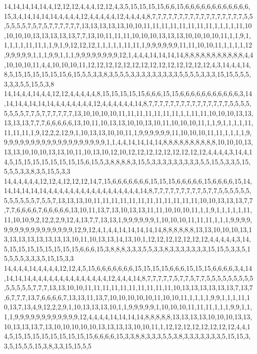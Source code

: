 14,14,14,14,14,4,12,12,12,4,4,4,12,12,4,3,5,15,15,15,15,6,6,15,6,6,6,6,6,6,6,6,6,6,6,6,15,3,4,14,14,14,14,4,4,4,4,12,4,4,4,4,4,12,4,4,4,4,8,7,7,7,7,7,7,7,7,7,7,7,7,7,7,7,7,7,5,5,5,5,5,5,7,5,7,5,7,7,7,7,7,7,13,13,13,13,13,10,10,11,11,11,11,11,11,11,11,1,1,1,1,11,10,10,10,10,13,13,13,13,13,7,7,13,10,11,11,11,10,10,10,13,13,13,10,10,10,10,11,1,1,9,1,1,1,1,1,11,11,1,1,9,1,9,12,12,12,1,1,1,1,1,11,11,1,9,9,9,9,9,9,11,11,10,10,11,1,1,1,1,12,9,9,9,9,9,1,1,1,9,9,1,1,1,9,9,9,9,9,9,9,9,12,1,4,4,4,14,14,14,14,8,8,8,8,8,8,8,8,8,8,8,4,4,10,10,10,11,4,4,10,10,10,11,12,12,12,12,12,12,12,12,12,12,12,12,12,12,4,3,14,4,4,14,8,5,15,15,15,15,15,15,6,15,5,5,3,3,8,3,5,5,5,3,3,3,3,3,3,3,3,3,5,5,5,5,3,3,3,15,15,5,5,5,3,3,3,5,5,15,5,3,8
14,14,4,4,14,4,4,12,12,4,4,4,4,4,8,15,15,15,15,15,6,6,6,15,15,6,6,6,6,6,6,6,6,6,6,6,3,14,14,14,4,14,14,14,4,4,4,4,4,4,4,12,4,4,4,4,4,4,14,8,7,7,7,7,7,7,7,7,7,7,7,7,7,7,7,5,5,5,5,5,5,5,5,7,7,5,7,7,7,7,7,7,13,10,10,10,10,11,11,11,11,11,11,11,1,1,11,11,10,10,10,13,13,13,13,13,7,7,7,6,6,6,6,6,13,10,11,10,13,13,10,10,13,10,11,10,10,10,11,1,1,9,1,1,1,1,11,11,11,11,1,9,12,2,2,12,9,1,10,13,13,10,10,11,1,9,9,9,9,9,9,11,10,10,10,11,11,1,1,1,1,9,9,9,9,9,9,9,9,9,9,9,9,9,9,9,9,9,9,9,9,1,1,4,4,14,14,14,14,8,8,8,8,8,8,8,8,8,8,10,10,10,13,13,13,10,10,10,13,13,10,11,10,13,10,12,10,12,12,12,12,12,12,12,12,12,4,4,4,4,3,14,4,14,5,15,15,15,15,15,15,15,15,6,15,5,3,8,8,8,8,3,15,5,3,3,3,3,3,3,3,3,3,5,5,15,5,3,3,5,15,5,5,5,3,3,8,3,5,15,5,3,3
14,4,4,4,4,4,12,12,4,12,12,12,14,7,15,6,6,6,6,6,6,6,15,15,15,6,6,6,6,6,15,6,6,6,6,15,14,14,14,14,14,14,4,4,4,4,4,4,4,4,4,4,4,4,4,4,4,4,4,14,8,7,7,7,7,7,7,7,7,7,5,7,7,5,5,5,5,5,5,5,5,5,5,5,5,7,5,5,7,13,13,13,10,11,11,11,11,11,11,11,11,11,11,11,11,10,10,13,13,13,7,7,7,7,6,6,6,6,7,6,6,6,6,6,13,10,11,13,7,13,10,13,13,11,11,10,10,10,11,1,1,9,1,1,1,1,1,11,11,10,10,9,2,12,2,2,9,12,4,13,7,7,13,13,1,9,9,9,9,9,9,1,10,10,10,11,11,11,1,1,1,9,9,9,9,9,9,9,9,9,9,9,9,9,9,9,9,9,12,9,12,4,1,4,4,14,14,14,14,14,8,8,8,8,8,8,13,13,10,10,10,13,13,13,13,13,13,13,13,13,10,11,10,13,13,14,13,10,1,12,12,12,12,12,12,12,4,4,4,4,4,3,14,5,15,15,15,15,15,15,15,15,6,6,6,15,3,8,8,8,3,3,3,5,5,3,3,8,3,3,3,3,3,3,3,15,15,5,3,3,5,15,5,5,5,3,3,3,5,15,15,3,3
14,4,4,4,14,4,4,4,4,12,12,4,5,15,6,6,6,6,6,6,6,15,15,15,15,6,6,6,15,15,15,6,6,6,6,3,4,14,14,14,14,4,4,4,4,4,4,4,4,4,4,4,4,4,4,12,4,4,4,14,8,7,7,7,7,7,5,7,7,5,7,7,5,5,5,5,5,5,5,5,5,5,5,5,5,5,7,7,7,13,13,10,10,11,11,11,11,11,11,11,11,11,11,10,13,13,13,13,13,13,7,13,7,6,7,7,7,13,7,6,6,6,6,7,13,13,11,13,7,10,10,10,10,10,11,10,10,11,1,1,1,1,9,9,1,1,1,11,10,13,7,13,4,9,12,2,2,9,1,10,13,13,13,10,1,1,9,9,9,9,9,1,10,10,10,11,11,11,1,1,1,9,9,1,1,1,1,9,9,9,9,9,9,9,9,9,9,9,9,12,4,4,4,4,14,14,14,14,8,8,8,8,8,13,13,13,13,10,10,10,13,13,10,13,13,13,7,13,10,10,10,10,10,13,13,13,13,10,10,11,1,12,12,12,12,12,12,12,12,4,4,14,5,15,15,15,15,15,15,15,15,15,6,6,6,6,15,3,3,8,8,3,3,3,5,5,3,8,3,3,3,3,3,3,3,5,15,15,3,3,5,15,5,5,15,3,8,3,3,15,15,5,5

